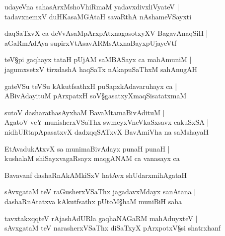 \begin{shloka}
udayeVna sahasArxMshoVhiRmaM yadavxdivxliVyateV |\\
tadavxnemxV duHKasaMGAtaH savaRthA nAshameVSayxti 
\end{shloka}

\begin{shloka}
daqSaTxvX ca deVvA\R saMpArxpAtxnagasotxyXV BagavAnaqSiH |\\
aGaRmAdAya supirxVtA\R savARMsAtxnaBayxpUjayeVtf 
\end{shloka}

\begin{shloka}
teV\S pi gaqhayx tataH pUjAM saMBASayx ca mahAmuniM |\\
jagumxsetxV tirxdashA haqSaTx nAkapuSaThxM sahAnugAH 
\end{shloka}

\begin{shloka}
gateVSu teVSu kAkutfsathxH puSapxkAdavaruhayx ca |\\
ABivAdayituM pArxpatxH soV\S gasatxyXmaqSisatatxmaM 
\end{shloka}

\begin{shloka}
sutoV dasharathasAyxhaM BavaMtamaBivAdituM |\\
AgatoV veY munisherxVSaThx swmeyxVneVkaSxsavx cakuSxSA |\\
nidhURtapApasatxvX dadxqqSATxvX BavAmiVha na saMshayaH 
\end{shloka}

\begin{shloka}
EtAvadukAtxvX sa munimaBivAdayx punaH punaH |\\
kushalaM shiSayxvagaRsayx maqgANAM ca vanasayx ca 
\end{shloka}

\begin{shloka}
Bavavanf dashaRnAkAMkiSxV hatAvx shUdarxmihAgataH 
\end{shloka}

\begin{shloka}
sAvxgataM teV raGusherxVSaThx jagadavxMdayx sanAtana |\\
dashaRnAtatxva kAkutfsathx pUtoM\S haM muniBiH saha
\end{shloka}

\begin{shloka}
tavxtakxqqteV rAjashAdURla gaqhaNAGaRM mahAduyxteV |\\
sAvxgataM teV narasherxVSaThx diSaTxyX pArxpotxV\S si shatrxhanf 
\end{shloka}

